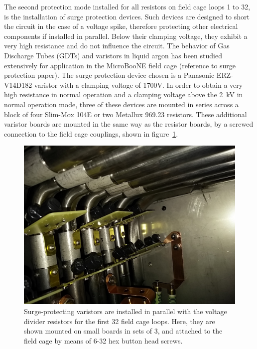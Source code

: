 The second protection mode installed for all resistors on field cage loops 1 to 32, is the installation of surge protection devices. Such devices are designed to short the circuit in the case of a voltage spike, therefore protecting other electrical components if installed in parallel. Below their clamping voltage, they exhibit a very high resistance and do not influence the circuit. The behavior of Gas Discharge Tubes (GDTs) and varistors in liquid argon has been studied extensively for application in the MicroBooNE field cage (reference to surge protection paper). The surge protection device chosen is a Panasonic ERZ-V14D182 varistor with a clamping voltage of 1700V. In order to obtain a very high resistance in normal operation and a clamping voltage above the 2~kV in normal operation mode, three of these devices are mounted in series across a block of four Slim-Mox 104E or two Metallux 969.23 resistors. These additional varistor boards are mounted in the same way as the resistor boards, by a screwed connection to the field cage couplings, shown in figure~\ref{fig:tpc-voltage-divider-varistors}.

\begin{figure}[htb]
\centering	
\includegraphics[width=0.8\linewidth]{figures/tpc-voltage-divider-varistors.jpg}
\caption{Surge-protecting varistors are installed in parallel with the voltage divider resistors for the first 32 field cage loops. Here, they are shown mounted on small boards in sets of 3, and attached to the field cage by means of 6-32 hex button head screws.}
\label{fig:tpc-voltage-divider-varistors}
\end{figure}





